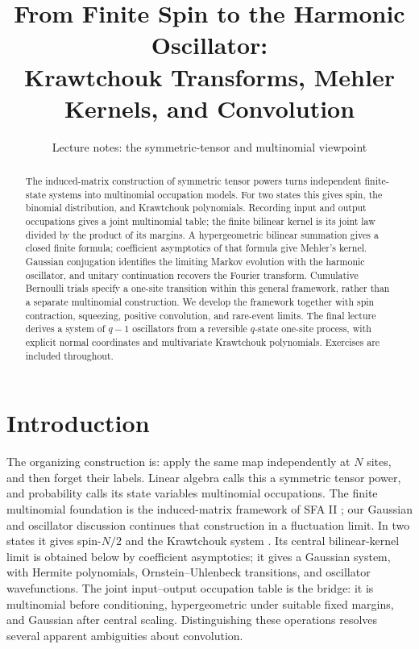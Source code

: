 \documentclass[11pt,reqno]{amsart}
\title[Finite Spin to the Harmonic Oscillator]{From Finite Spin to the Harmonic Oscillator:\\Krawtchouk Transforms, Mehler Kernels, and Convolution}
\date{Lecture notes: the symmetric-tensor and multinomial viewpoint}
\theoremstyle{definition}
\theoremstyle{remark}
\begin{document}
\begin{abstract}
The induced-matrix construction of symmetric tensor powers turns
independent finite-state systems into multinomial occupation models. For two states this gives spin, the binomial
distribution, and Krawtchouk polynomials. Recording input and output
occupations gives a joint multinomial table; the finite bilinear kernel
is its joint law divided by the product of its margins. A hypergeometric bilinear summation gives a closed finite formula;
coefficient asymptotics of that formula give Mehler's kernel. Gaussian
conjugation identifies the limiting Markov evolution with the harmonic
oscillator, and unitary continuation recovers the Fourier transform.
Cumulative Bernoulli trials specify a one-site transition within this
general framework, rather than a separate multinomial construction.
We develop the framework together with spin contraction, squeezing,
positive convolution, and rare-event limits. The final lecture derives
a system of $q-1$ oscillators from a reversible $q$-state one-site
process, with explicit normal coordinates and multivariate Krawtchouk
polynomials. Exercises are included throughout.
\end{abstract}
\maketitle
\tableofcontents
\section*{Introduction}
The organizing construction is: apply the same map independently at
$N$ sites, and then forget their labels. Linear algebra calls this a
symmetric tensor power, and probability calls its state variables
multinomial occupations. The finite multinomial foundation is the
induced-matrix framework of SFA II \cite{FeinsilverSFAII2023}; our
Gaussian and oscillator discussion continues that construction in a
fluctuation limit. In two states it gives spin-$N/2$ and the
Krawtchouk system \cite{Krawtchouk1929,FeinsilverKocik2005}.
Its central bilinear-kernel limit is obtained below by coefficient
asymptotics; it gives a Gaussian system, with Hermite polynomials,
Ornstein--Uhlenbeck transitions, and oscillator wavefunctions.
The joint input--output occupation table is the bridge: it is
multinomial before conditioning, hypergeometric under suitable fixed
margins, and Gaussian after central scaling. Distinguishing these
operations resolves several apparent ambiguities about convolution.
\end{document}
